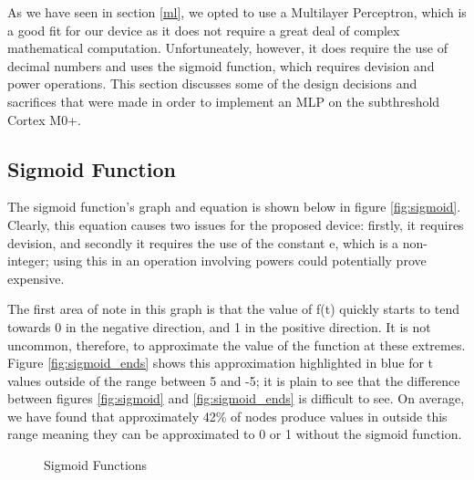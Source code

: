 
As we have seen in section \ref{ml}, we opted to use a Multilayer Perceptron, which is a good fit for our device as it does not require a great deal of complex mathematical computation. Unfortuneately, however, it does require the use of decimal numbers and uses the sigmoid function, which requires devision and power operations. This section discusses some of the design decisions and sacrifices that were made in order to implement an MLP on the subthreshold Cortex M0+.

\subsection{Sigmoid Function}
The sigmoid function's graph and equation is shown below in figure \ref{fig:sigmoid}. Clearly, this equation causes two issues for the proposed device: firstly, it requires devision, and secondly it requires the use of the constant e, which is a non-integer; using this in an operation involving powers could potentially prove expensive.

The first area of note in this graph is that the value of f(t) quickly starts to tend towards 0 in the negative direction, and 1 in the positive direction. It is not uncommon, therefore, to approximate the value of the function at these extremes. Figure \ref{fig:sigmoid_ends} shows this approximation highlighted in blue for t values outside of the range between 5 and -5; it is plain to see that the difference between figures \ref{fig:sigmoid} and \ref{fig:sigmoid_ends} is difficult to see. On average, we have found that approximately 42\%  of nodes produce values in outside this range meaning they can be approximated to 0 or 1 without the sigmoid function.

\begin{figure}[!htbp]
    \centering
    \caption{Sigmoid Functions \label{fig:sigmoid-options}}
\end{figure}

